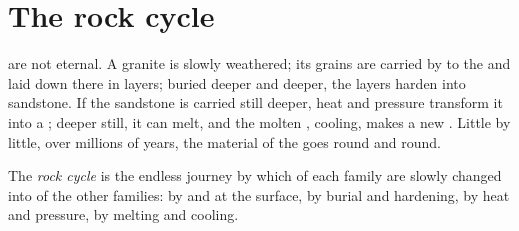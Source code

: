 \section{The rock cycle}

 are not eternal. A granite  is slowly weathered; its grains
are carried by  to the  and laid down there in layers; buried
deeper and deeper, the layers harden into sandstone. If the sandstone is
carried still deeper, heat and pressure transform it into a ; deeper still, it can melt, and the molten , cooling, makes a new
. Little by little, over millions of years, the material of
the  goes round and round.

\begin{definition}\label{def:g6:rocks-and-minerals:rock-cycle}
The \emph{rock cycle} is the endless journey by which
 of each family are slowly changed into  of the other families:
by  and  at the surface, by burial and hardening, by heat
and pressure, by melting and cooling.
\end{definition}

